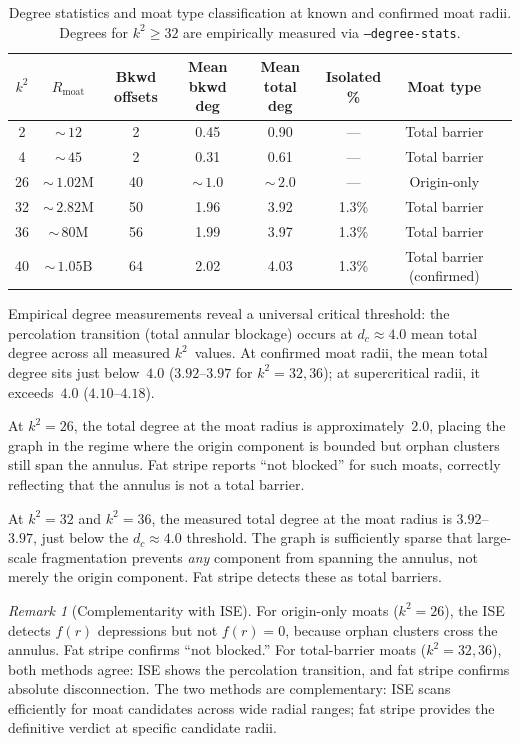 \documentclass[11pt,a4paper]{article}
\newcommand{\fr}{f(r)}
\theoremstyle{definition}
\theoremstyle{plain}
\theoremstyle{remark}
\newtheorem{remark}[theorem]{Remark}
\begin{document}
\begin{table}[ht]
\centering
\small
\begin{tabular}{@{}cccccccl@{}}
\toprule
$k^2$ & $R_{\text{moat}}$ & Bkwd offsets & Mean bkwd deg & Mean total deg & Isolated \% & Moat type \\
\midrule
2  & ${\sim}\,12$       & 2  & 0.45 & 0.90 & --- & Total barrier \\
4  & ${\sim}\,45$       & 2  & 0.31 & 0.61 & --- & Total barrier \\
26 & ${\sim}\,1.02\text{M}$ & 40 & ${\sim}\,1.0$ & ${\sim}\,2.0$ & --- & Origin-only \\
32 & ${\sim}\,2.82\text{M}$ & 50 & 1.96 & 3.92 & 1.3\% & Total barrier \\
36 & ${\sim}\,80\text{M}$   & 56 & 1.99 & 3.97 & 1.3\% & Total barrier \\
40 & ${\sim}\,1.05\text{B}$ & 64 & 2.02 & 4.03 & 1.3\% & Total barrier (confirmed) \\
\bottomrule
\end{tabular}
\caption{Degree statistics and moat type classification at known and confirmed moat radii.  Degrees for $k^2 \ge 32$ are empirically measured via \texttt{--degree-stats}.}
\label{tab:moat-types}
\end{table}

Empirical degree measurements reveal a universal critical threshold: the percolation transition (total annular blockage) occurs at $d_c \approx 4.0$ mean total degree across all measured $k^2$~values.  At confirmed moat radii, the mean total degree sits just below~$4.0$ ($3.92$--$3.97$ for $k^2 = 32, 36$); at supercritical radii, it exceeds~$4.0$ ($4.10$--$4.18$).

At $k^2 = 26$, the total degree at the moat radius is approximately~$2.0$, placing the graph in the regime where the origin component is bounded but orphan clusters still span the annulus.  Fat stripe reports ``not blocked'' for such moats, correctly reflecting that the annulus is not a total barrier.

At $k^2 = 32$ and $k^2 = 36$, the measured total degree at the moat radius is $3.92$--$3.97$, just below the $d_c \approx 4.0$ threshold.  The graph is sufficiently sparse that large-scale fragmentation prevents \emph{any} component from spanning the annulus, not merely the origin component.  Fat stripe detects these as total barriers.

\begin{remark}[Complementarity with ISE]\label{rem:complementarity}
For origin-only moats ($k^2 = 26$), the ISE detects $\fr$ depressions but not $\fr = 0$, because orphan clusters cross the annulus.  Fat stripe confirms ``not blocked.''  For total-barrier moats ($k^2 = 32, 36$), both methods agree: ISE shows the percolation transition, and fat stripe confirms absolute disconnection.  The two methods are complementary: ISE scans efficiently for moat candidates across wide radial ranges; fat stripe provides the definitive verdict at specific candidate radii.
\end{remark}
\end{document}
